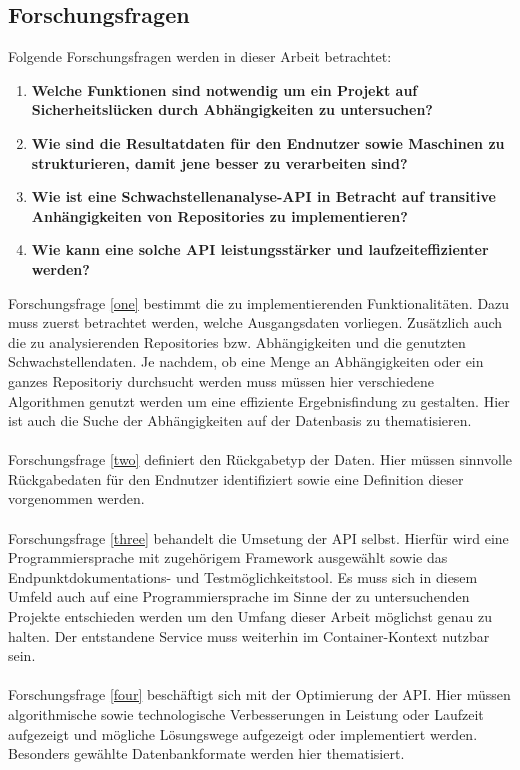 \subsection{Forschungsfragen} \label{sec:Forschungsfragen}
Folgende Forschungsfragen werden in dieser Arbeit betrachtet:
\begin{enumerate}
    \item \textbf{Welche Funktionen sind notwendig um ein Projekt auf Sicherheitslücken durch Abhängigkeiten zu untersuchen?} \label{one}
    \item \textbf{Wie sind die Resultatdaten für den Endnutzer sowie Maschinen zu strukturieren, damit jene besser zu verarbeiten sind?} \label{two}
    \item \textbf{Wie ist eine Schwachstellenanalyse-API in Betracht auf transitive Anhängigkeiten von Repositories zu implementieren?} \label{three}
    \item \textbf{Wie kann eine solche API leistungsstärker und laufzeiteffizienter werden?} \label{four}
\end{enumerate}
Forschungsfrage \ref{one} bestimmt die zu implementierenden Funktionalitäten.
Dazu muss zuerst betrachtet werden, welche Ausgangsdaten vorliegen.
Zusätzlich auch die zu analysierenden Repositories bzw. Abhängigkeiten und die genutzten Schwachstellendaten.
Je nachdem, ob eine Menge an Abhängigkeiten oder ein ganzes Repositoriy durchsucht werden muss müssen hier verschiedene Algorithmen genutzt werden um eine effiziente Ergebnisfindung zu gestalten.
Hier ist auch die Suche der Abhängigkeiten auf der Datenbasis zu thematisieren. 
\\ \\
Forschungsfrage \ref{two} definiert den Rückgabetyp der Daten.
Hier müssen sinnvolle Rückgabedaten für den Endnutzer identifiziert sowie eine Definition dieser vorgenommen werden.
\\ \\
Forschungsfrage \ref{three} behandelt die Umsetung der API selbst.
Hierfür wird eine Programmiersprache mit zugehörigem Framework ausgewählt sowie das Endpunktdokumentations- und Testmöglichkeitstool.
Es muss sich in diesem Umfeld auch auf eine Programmiersprache im Sinne der zu untersuchenden Projekte entschieden werden um den Umfang dieser Arbeit möglichst genau zu halten.
Der entstandene Service muss weiterhin im Container-Kontext nutzbar sein.
\\ \\
Forschungsfrage \ref{four} beschäftigt sich mit der Optimierung der API.
Hier müssen algorithmische sowie technologische Verbesserungen in Leistung oder Laufzeit aufgezeigt und mögliche Lösungswege aufgezeigt oder implementiert werden.
Besonders gewählte Datenbankformate werden hier thematisiert.